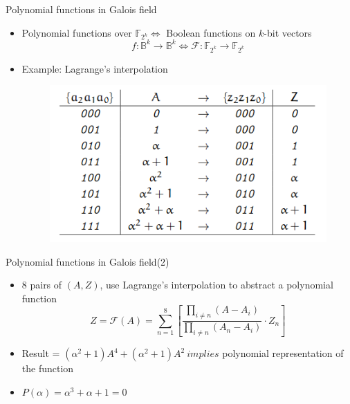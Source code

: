 \documentclass[xcolor=dvipsnames]{beamer}
\newcommand{\Fkk}{{\mathbb{F}}_{2^k}}
\newcommand{\bi}{\begin{itemize}}
\newcommand{\ei}{\end{itemize}}
\newcommand{\F}{{\mathcal{F}}}
\newcommand{\B}{{\mathbb{B}}}
\begin{document}
\begin{frame}{\large{Polynomial functions in Galois field}}
\bi
\item Polynomial functions over $\Fkk \Leftrightarrow$ Boolean functions on $k$-bit vectors
$$f:\B^k \to \B^k \Leftrightarrow \mathcal F:\Fkk \to \Fkk$$
\item Example: Lagrange's interpolation
\begin{figure}[H]
\centerline{
\includegraphics[scale=0.45]{lagrange.png}
}
\end{figure}
\ei
\end{frame}
\begin{frame}{\large{Polynomial functions in Galois field(2)}}
\bi
\item 8 pairs of $(A,Z)$, use Lagrange's interpolation to abstract a polynomial function
$$Z = \F(A) = \sum_{n=1}^{8}\left[ \frac{\prod_{i\neq n}(A-A_i)}{\prod_{i\neq n}(A_n-A_i)}\cdot Z_n \right]$$
\item Result = $(\alpha^2+1)A^4+(\alpha^2+1)A^2~ implies$ \alert{polynomial representation of the function} 
\item $P(\alpha) = \alpha^3+\alpha+1 = 0$
\ei
\end{frame}
\end{document}

